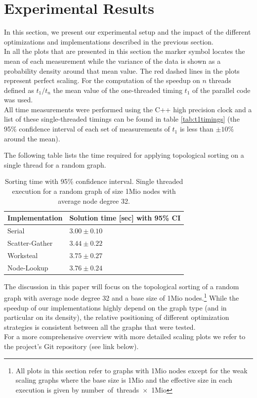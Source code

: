\section{Experimental Results}\label{sec:exp}
%
In this section, we present our experimental setup and the impact of the different optimizations and implementations described in the previous section. \\
%
In all the plots that are presented in this section the marker symbol locates the mean of each measurement while the variance of the data is shown as a probability density around that mean value.
The red dashed lines in the plots represent perfect scaling.
For the computation of the speedup on $n$ threads defined as $t_1/t_n$ the mean value of the one-threaded timing $t_1$ of the parallel code was used. \\
All time measurements were performed using the C++ high precision clock and a list of these single-threaded timings can be found in table \ref{tab:t1timings} (the 95\% confidence interval of each set of measurements of $t_1$ is less than $\pm 10\%$ around the mean). \\
\par\medskip
The following table lists the time required for applying topological sorting on a single thread for a random graph.

  \begin{table}[h]
    \centering
    \begin{tabular}{ll}
		Implementation	& Solution time [sec] with 95\% CI \\
    \toprule
    Serial				& $3.00 \pm 0.10$ \\
    Scatter-Gather		& $3.44 \pm 0.22$ \\
    Worksteal			& $3.75 \pm 0.27$ \\
    Node-Lookup			& $3.76 \pm 0.24$ \\
    \bottomrule
    \end{tabular}
    \caption{Sorting time with 95\% confidence interval. Single threaded execution for a random graph of size 1Mio nodes with average node degree 32.}
    \label{tab:abstimings}
  \end{table}
\par\medskip
The discussion in this paper will focus on the topological sorting of a random graph with average node degree 32 and a base size of 1Mio nodes.\footnote{All plots in this section refer to graphs with 1Mio nodes except for the weak scaling graphs where the base size is 1Mio and the effective size in each execution is given by number~of~threads~$\times$~1Mio} 
While the speedup of our implementations highly depend on the graph type (and in particular on its density), the relative positioning of different optimization strategies is consistent between all the graphs that were tested. \\
For a more comprehensive overview with more detailed scaling plots we refer to the project's Git repository (see link below).

